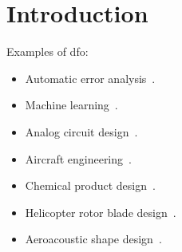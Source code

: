 \chapter{Introduction}

%
%
%

Examples of \gls{dfo}:
\begin{itemize}
    \item Automatic error analysis~\cite{Higham_1993,Higham_2002}.
    \item Machine learning~\cite{Ghanbari_Scheinberg_2017}.
    \item Analog circuit design~\cite{Latorre_Etal_2019}.
    \item Aircraft engineering~\cite{Gazaix_Etal_2019}.
    \item Chemical product design~\cite{Sun_Etal_2020}.
    \item Helicopter rotor blade design~\cite{Booker_Etal_1998a,Booker_Etal_1998b,Serafini_1999}.
    \item Aeroacoustic shape design~\cite{Marsden_2004,Marsden_Etal_2004}.
\end{itemize}

